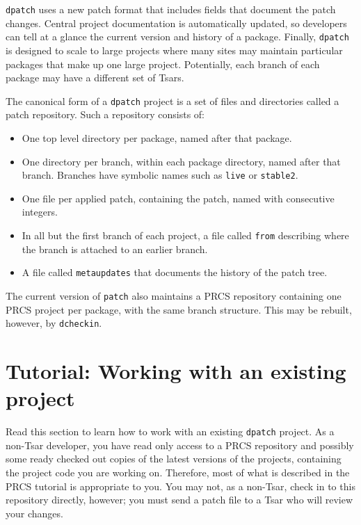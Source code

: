 \documentclass{article}
\begin{document}
\texttt{dpatch} uses a new patch format that includes fields that
document the patch changes. Central project documentation is
automatically updated, so developers can tell at a glance the current
version and history of a package. Finally, \texttt{dpatch} is designed
to scale to large projects where many sites may maintain particular
packages that make up one large project. Potentially, each branch of
each package may have a different set of Tsars.

The canonical form of a \texttt{dpatch} project is a set of files and
directories called a patch repository. Such a repository consists of:

\begin{itemize}
\item One top level directory per package, named after that package.

\item One directory per branch, within each package directory, named
after that branch. Branches have symbolic names such as \texttt{live} or
\texttt{stable2}.

\item One file per applied patch, containing the patch, named with
consecutive integers. 

\item In all but the first branch of each project, a file called
\texttt{from} describing where the branch is attached to an earlier branch.

\item A file called \texttt{metaupdates} that documents the history of
the patch tree.
\end{itemize}

The current version of \texttt{patch} also maintains a PRCS repository
containing one PRCS project per package, with the same branch
structure. This may be rebuilt, however, by \texttt{dcheckin}. 



\section{Tutorial: Working with an existing project}

Read this section to learn how to work with an existing
\texttt{dpatch} project. As a non-Tsar developer, you have read only
access to a PRCS repository and possibly some ready checked out
copies of the latest versions of the projects, containing the project code you are
working on. Therefore, most of what is described in the PRCS tutorial
is appropriate to you. You may not, as a non-Tsar, check in to this
repository directly, however; you must send a patch file to a Tsar who
will review your changes.
\end{document}
